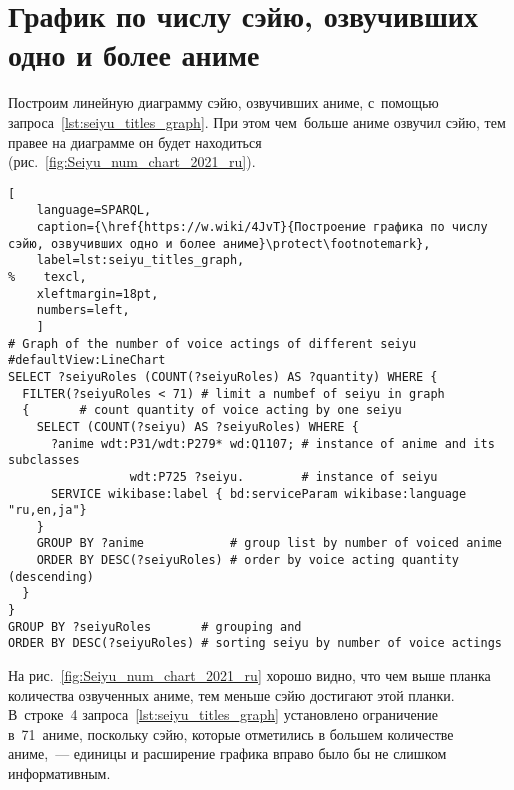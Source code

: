 \section{График по числу сэйю, озвучивших одно и более аниме}

Построим линейную диаграмму сэйю, озвучивших аниме, с~помощью запроса~\ref{lst:seiyu_titles_graph}. 
При этом чем~больше аниме озвучил сэйю, тем правее на диаграмме он будет находиться (рис.~\ref{fig:Seiyu_num_chart_2021_ru}). 

\begin{lstlisting}[ 
    language=SPARQL, 
    caption={\href{https://w.wiki/4JvT}{Построение графика по числу сэйю, озвучивших одно и более аниме}\protect\footnotemark},
    label=lst:seiyu_titles_graph,
%    texcl,
    xleftmargin=18pt, 
    numbers=left,
    ]
# Graph of the number of voice actings of different seiyu
#defaultView:LineChart
SELECT ?seiyuRoles (COUNT(?seiyuRoles) AS ?quantity) WHERE {
  FILTER(?seiyuRoles < 71) # limit a numbef of seiyu in graph
  {       # count quantity of voice acting by one seiyu
    SELECT (COUNT(?seiyu) AS ?seiyuRoles) WHERE { 
      ?anime wdt:P31/wdt:P279* wd:Q1107; # instance of anime and its subclasses
                 wdt:P725 ?seiyu.        # instance of seiyu
      SERVICE wikibase:label { bd:serviceParam wikibase:language "ru,en,ja"}
    }
    GROUP BY ?anime            # group list by number of voiced anime
    ORDER BY DESC(?seiyuRoles) # order by voice acting quantity (descending)
  }
}
GROUP BY ?seiyuRoles       # grouping and
ORDER BY DESC(?seiyuRoles) # sorting seiyu by number of voice actings
\end{lstlisting}%


\newpage
На рис.~\ref{fig:Seiyu_num_chart_2021_ru} хорошо видно, 
что чем выше планка количества озвученных аниме, 
тем меньше сэйю достигают этой планки. 
В~строке~4 запроса~\ref{lst:seiyu_titles_graph} установлено ограничение в~71~аниме, 
поскольку сэйю, которые отметились в большем количестве аниме,~--- единицы и расширение графика вправо было бы не слишком информативным.

